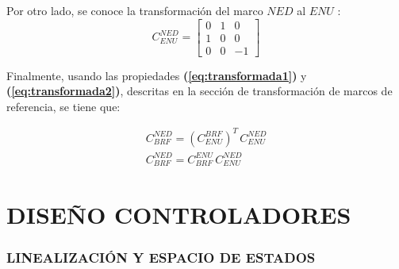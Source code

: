 Por otro lado, se conoce la transformación del marco $NED$ al $ENU$ :
$$
C_{ENU}^{NED}=\left[\begin{array}{ccc}
	0 &1 &0 \\
	1 & 0 & 0 \\
	0 & 0 &-1
\end{array}\right]
$$

Finalmente, usando las propiedades \textbf{(\ref{eq:transformada1})} y \textbf{(\ref{eq:transformada2})}, descritas en la sección de transformación de marcos de referencia, se tiene que:

\begin{gather}
	C_{BRF}^{NED} = \left(C_{ENU}^{BRF}\right)^T\,C_{ENU}^{NED}\\[10pt]
	C_{BRF}^{NED} = C_{BRF}^{ENU}\,C_{ENU}^{NED}
\end{gather}
	



\newpage
\section{DISEÑO CONTROLADORES}
\subsubsection{LINEALIZACIÓN Y ESPACIO DE ESTADOS}


